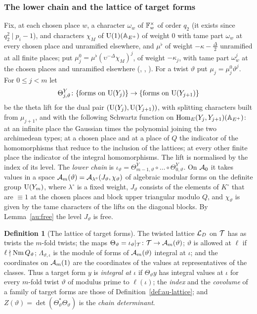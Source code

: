 \documentclass[10pt]{amsart}
\theoremstyle{definition}
\newtheorem{definition}[theorem]{Definition}
\theoremstyle{remark}
\begin{document}
\subsubsection*{The lower chain and the lattice of target forms}
Fix, at each chosen place $w$, a character $\omega_w$ of $\mathbb F_w^\times$ of order $q_2$ (it exists
since $q_2^2\mid p_i-1$), and characters $\chi_M$ of $\mathrm U(1)(\mathbb A_{E^+})$ of weight $0$ with tame part
$\omega_w$ at every chosen place and unramified elsewhere, and $\mu^\flat$ of weight
$-\kappa-\frac\Delta2$ unramified at all finite places; put $\mu_j^0=\mu^\flat(\upsilon^{-\Delta}\chi_M)^j$,
of weight $-\kappa_j$, with tame part $\omega_w^j$ at the chosen places and unramified elsewhere
({\cite[Lemma~8.6]{P49}}, {\cite[Definition~6.14]{P54}}, {\cite[Proposition~6.15]{P54}}). For a twist
$\vartheta$ put $\mu_j=\mu_j^0\vartheta^j$. For $0\le j<m$ let
\[
\Theta^Y_{j,\vartheta}\colon\{\text{forms on }\mathrm U(Y_j)\}\to\{\text{forms on }\mathrm U(Y_{j+1})\}
\]
be the theta lift for the dual pair $(\mathrm U(Y_j),\mathrm U(Y_{j+1}))$, with splitting characters built
from $\mu_{j+1}$, and with the following Schwartz function on $\operatorname{Hom}_E(Y_j,Y_{j+1})(\mathbb A_{E^+})$:
at an infinite place the Gaussian times the polynomial joining the two archimedean types; at a
chosen place and at a place of $Q$ the indicator of the homomorphisms that reduce to the inclusion
of the lattices; at every other finite place the indicator of the integral homomorphisms. The lift
is normalised by the index of its level. The \emph{lower chain} is
$\iota_\vartheta=\Theta^Y_{m-1,\vartheta}\circ\dots\circ\Theta^Y_{0,\vartheta}$. On $\mathcal A_0$ it
takes values in a space $\mathcal A_m(\vartheta)=\mathcal A_{\lambda^\circ}(J_\vartheta,\chi_\vartheta)$
of algebraic modular forms on the definite group $\mathrm U(Y_m)$, where $\lambda^\circ$ is a fixed
weight, $J_\vartheta$ consists of the elements of $K^\circ$ that are $\equiv1$ at the chosen places
and block upper triangular modulo $Q$, and $\chi_\vartheta$ is given by the tame characters of the
lifts on the diagonal blocks. By Lemma~\ref{au:free} the level $J_\vartheta$ is free.

\begin{definition}[The lattice of target forms]\label{def:au-targetlattice}
The twisted lattice $\mathcal L_D$ on $\mathcal T$ has as twists the $m$-fold twists; the maps
$\Theta_\vartheta=\iota_\vartheta|_{\mathcal T}\colon\mathcal T\to\mathcal A_m(\vartheta)$; $\vartheta$ is allowed at
$\ell$ if $\ell\nmid\operatorname{Nm} Q_\vartheta$; $\Lambda_{\vartheta,\iota}$ is the module of forms of
$\mathcal A_m(\vartheta)$ integral at $\iota$; and the coordinates on $\mathcal A_m(1)$ are the coordinates of
the values at representatives of the classes. Thus a target form $y$ is \emph{integral at $\iota$}
if $\Theta_\vartheta y$ has integral values at $\iota$ for every $m$-fold twist $\vartheta$ of
modulus prime to $\ell(\iota)$; the \emph{index} and the \emph{covolume} of a family of target
forms are those of Definition~\ref{def:au-lattice}; and $Z(\vartheta)=\det(\Theta_\vartheta^*
\Theta_\vartheta)$ is the \emph{chain determinant}.
\end{definition}
\end{document}
